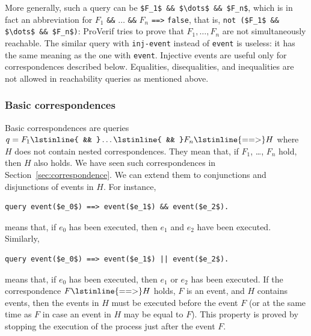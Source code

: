 \documentclass{book}
\begin{document}
More generally, such a query can be \lstinline!$F_1$ && $\dots$ && $F_n$!, which is in fact an abbreviation for $F_1$ \lstinline{&&} $\dots$ \lstinline{&&} $F_n$ \lstinline{==>} \lstinline{false}, that is, \lstinline{not ($F_1$ && $\dots$ && $F_n$)}: ProVerif tries to prove that $F_1, \dots, F_n$ are not simultaneously reachable.
The similar query with \lstinline!inj-event! instead of \lstinline!event! is useless: it has the same meaning as the one with \lstinline!event!. Injective events are useful only for correspondences described below. Equalities, disequalities, and inequalities are not allowed in reachability queries as mentioned above.

\subsubsection{Basic correspondences}

Basic correspondences are queries $q = F_1 \lstinline{ && }\dots\lstinline{ && }F_n\lstinline{ ==> } H$ where
$H$ does not contain nested correspondences. They mean that, if $F_1$, \dots, $F_n$
hold, then $H$ also holds. We have seen such correspondences in Section~\ref{sec:correspondence}.
We can extend them to conjunctions and disjunctions of events in $H$. For instance,
\begin{lstlisting}[numbers=none]
	query event($e_0$) ==> event($e_1$) && event($e_2$).
\end{lstlisting}
means that, if $e_0$ has been executed, then $e_1$ and $e_2$ have been executed.
Similarly,
\begin{lstlisting}[numbers=none]
	query event($e_0$) ==> event($e_1$) || event($e_2$).
\end{lstlisting}
means that, if $e_0$ has been executed, then $e_1$ or $e_2$ has been executed.
If the correspondence $F \lstinline{ ==> } H$ holds, $F$
is an event, and $H$ contains events, then the events in $H$ must be executed
before the event $F$ (or at the same time as $F$ in case an event in $H$
may be equal to $F$). This property is proved by stopping the execution
of the process just after the event $F$.
\end{document}
